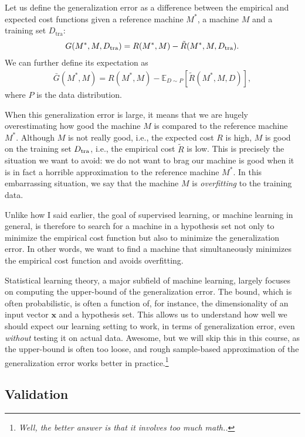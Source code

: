 \documentclass{report}
\newcommand{\vect}[1]{\mathbf{#1}}
\newcommand{\vx}[0]{\vect{x}}
\newcommand{\tra}{\text{tra}}
\begin{document}
Let us define the generalization error as a difference between the empirical and
expected cost functions given a reference machine $M^*$, a machine $M$ and a
training set $D_{\tra}$:
\begin{align}
    \label{eq:generr}
    G(M^*, M, D_{\tra}) = R(M^*, M) - \tilde{R}(M^*, M, D_{\text{\tra}}).
\end{align}
We can further define its expectation as
\begin{align}
    \label{eq:generr_ee}
    \bar{G}(M^*, M) = R(M^*, M) - \mathbb{E}_{D \sim P} \left[\tilde{R}(M^*, M,
    D)\right],
\end{align}
where $P$ is the data distribution. 

When this generalization error is large, it means that we are hugely
overestimating how good the machine $M$ is compared to the reference machine
$M^*$. Although $M$ is not really good, i.e., the expected cost $R$ is high, $M$
is good on the training set $D_{\text{\tra}}$, i.e., the empirical cost
$\tilde{R}$ is low. This is precisely the situation we want to avoid: we do not
want to brag our machine is good when it is in fact a horrible approximation to
the reference machine $M^*$. In this embarrassing situation, we say that the
machine $M$ is {\it overfitting} to the training data.

Unlike how I said earlier, the goal of supervised learning, or machine learning
in general, is therefore to search for a machine in a hypothesis set not only to
minimize the empirical cost function but also to minimize the generalization
error. In other words, we want to find a machine that simultaneously minimizes
the empirical cost function and avoids overfitting.

Statistical learning theory, a major subfield of machine learning, largely
focuses on computing the upper-bound of the generalization error. The bound,
which is often probabilistic, is often a function of, for instance, the
dimensionality of an input vector $\vx$ and a hypothesis set. This allows us to
understand how well we should expect our learning setting to work, in terms of
generalization error, even {\it without} testing it on actual data. Awesome, but
we will skip this in this course, as the upper-bound is often too loose, and
rough sample-based approximation of the generalization error works better in
practice.\footnote{
    {\it Well, the better answer is that it involves too much math..}
} 

\subsection{Validation}
\label{sec:validation}
\end{document}
